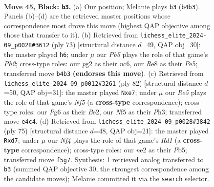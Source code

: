 \documentclass[11pt]{article}
\begin{document}
\clearpage

\begin{figure}[p]\centering
\begin{subfigure}{0.46\textwidth}\centering
\resizebox{\linewidth}{!}{%
\newchessgame
\chessboard[
  setfen={4r3/8/3p1kp1/5n1p/1p2r2P/8/R3NKP1/R7 b - - 2 45},
  showmover=false,
  pgfstyle=straightmove, color=movearrow, markmove={b4-b3}
]}
\caption{}
\end{subfigure}\hfill
\begin{subfigure}{0.46\textwidth}\centering
\resizebox{\linewidth}{!}{%
\newchessgame
\chessboard[
  setfen={7k/6pp/2N5/4pp1r/2K1n3/3R3P/3B3P/8 b - - 5 37},
  showmover=false,
  pgfstyle=straightmove, color=movearrow, markmove={h7-h6}
]}
\caption{}
\end{subfigure}
\\[4pt]
\begin{subfigure}{0.46\textwidth}\centering
\resizebox{\linewidth}{!}{%
\newchessgame
\chessboard[
  setfen={8/2r1np1k/7p/2r2N2/R3PK2/7P/4B1P1/8 w - - 5 42},
  showmover=false,
  pgfstyle=straightmove, color=movearrow, markmove={f5-e7}
]}
\caption{}
\end{subfigure}\hfill
\begin{subfigure}{0.46\textwidth}\centering
\resizebox{\linewidth}{!}{%
\newchessgame
\chessboard[
  setfen={3r4/3Pkp1p/6p1/1p2r3/1R6/7P/8/1R5K b - - 1 38},
  showmover=false,
  pgfstyle=straightmove, color=movearrow, markmove={d8-d7}
]}
\caption{}
\end{subfigure}
\caption{\textbf{Move 45, Black: \texttt{b3}.} (a) Our position; Melanie plays \texttt{b3} (\texttt{b4b3}). Panels (b)--(d) are the retrieved master positions whose correspondence most drove this move (highest QAP objective among those that transfer to it). (b) Retrieved from \texttt{lichess\_elite\_2024-09\_p0028\#3612} (ply 73) [structural distance $d$=49, QAP obj=30]: the master played \texttt{h6}; under $\mu$ our \emph{Pb5} plays the role of that game's \emph{Ph2}; cross-type roles: our \emph{p}g2 as their \emph{n}c6, our \emph{R}e8 as their \emph{P}e5; transferred move \texttt{b4b3} \textbf{(endorses this move)}. (c) Retrieved from \texttt{lichess\_elite\_2024-09\_p0012\#3261} (ply 82) [structural distance $d$=50, QAP obj=31]: the master played \texttt{Nxe7}; under $\mu$ our \emph{Re5} plays the role of that game's \emph{Nf5} (a \textbf{cross-type} correspondence); cross-type roles: our \emph{P}g6 as their \emph{B}e2, our \emph{N}f5 as their \emph{P}h3; transferred move \texttt{e4c4}. (d) Retrieved from \texttt{lichess\_elite\_2024-09\_p0028\#3842} (ply 75) [structural distance $d$=48, QAP obj=21]: the master played \texttt{Rxd7}; under $\mu$ our \emph{Nf4} plays the role of that game's \emph{Rd1} (a \textbf{cross-type} correspondence); cross-type roles: our \emph{n}e2 as their \emph{P}b5; transferred move \texttt{f5g7}. Synthesis: 1 retrieved analog transferred to \texttt{b3} (summed QAP objective 30, the strongest correspondence among the candidate moves); Melanie committed it via the \texttt{search} selector.}
\label{fig:thought-m89}
\end{figure}
\end{document}
